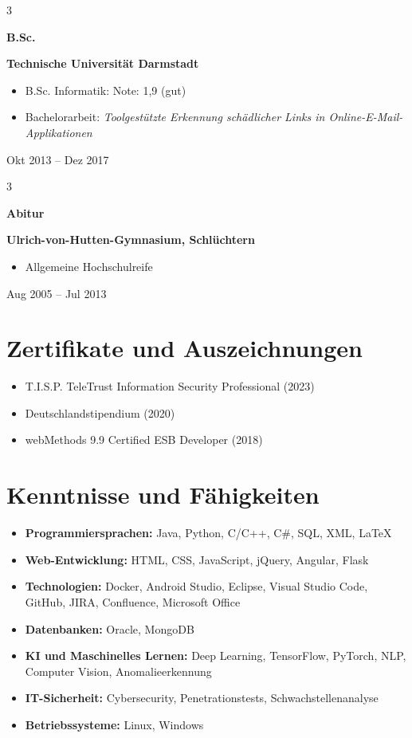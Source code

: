 \documentclass[10pt, letterpaper]{article}
\newenvironment{highlights}{
    \begin{itemize}[
        topsep=0.10 cm,
        parsep=0.10 cm,
        partopsep=0pt,
        itemsep=0pt,
        leftmargin=0.4 cm + 10pt
    ]
}{
    \end{itemize}
} %
\newenvironment{threecolentry}[3][]{
    \onecolentry
    \def\thirdColumn{#3}
    \setcolumnwidth{1 cm, \fill, 4.5 cm}
    \begin{paracol}{3}
    {\raggedright #2} \switchcolumn
}{
    \switchcolumn \raggedleft \thirdColumn
    \end{paracol}
    \endonecolentry
} %
\begin{document}
\begin{threecolentry}{\textbf{B.Sc.}}{
    Okt 2013 – Dez 2017
}
    \textbf{Technische Universität Darmstadt}
    \begin{highlights}
        \item B.Sc. Informatik: Note: 1,9 (gut)
        \item Bachelorarbeit: \textit{Toolgestützte Erkennung schädlicher Links in Online-E-Mail-Applikationen}
    \end{highlights}
\end{threecolentry}

\begin{threecolentry}{\textbf{Abitur}}{
    Aug 2005 – Jul 2013
}
    \textbf{Ulrich-von-Hutten-Gymnasium, Schlüchtern}
    \begin{highlights}
        \item Allgemeine Hochschulreife
    \end{highlights}
\end{threecolentry}
\section{Zertifikate und Auszeichnungen}

\begin{highlights}
    \item T.I.S.P. TeleTrust Information Security Professional (2023)
    \item Deutschlandstipendium (2020)
    \item webMethods 9.9 Certified ESB Developer (2018)
\end{highlights}

\section{Kenntnisse und Fähigkeiten}

\begin{highlights}
    \item \textbf{Programmiersprachen:} Java, Python, C/C++, C\#, SQL, XML, LaTeX
    \item \textbf{Web-Entwicklung:} HTML, CSS, JavaScript, jQuery, Angular, Flask
    \item \textbf{Technologien:} Docker, Android Studio, Eclipse, Visual Studio Code, GitHub, JIRA, Confluence, Microsoft Office
    \item \textbf{Datenbanken:} Oracle, MongoDB
    \item \textbf{KI und Maschinelles Lernen:} Deep Learning, TensorFlow, PyTorch, NLP, Computer Vision, Anomalieerkennung
    \item \textbf{IT-Sicherheit:} Cybersecurity, Penetrationstests, Schwachstellenanalyse
    \item \textbf{Betriebssysteme:} Linux, Windows
\end{highlights}
\end{document}
